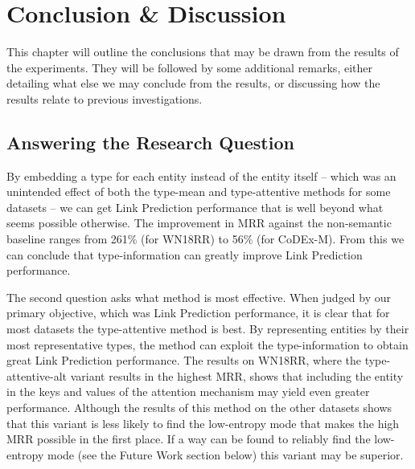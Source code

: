 \chapter{Conclusion \& Discussion}
\label{ch:conclusion}



This chapter will outline the conclusions that may be drawn from the results of the experiments. They will be followed by some additional remarks, either detailing what else we may conclude from the results, or discussing how the results relate to previous investigations. 


\section*{Answering the Research Question}

\begin{quote}
    
\end{quote}
%
By embedding a type for each entity instead of the entity itself 
-- which was an unintended effect of both the type-mean and type-attentive methods for some datasets -- we can get Link Prediction performance that is well beyond what seems possible otherwise. 
The improvement in MRR against the non-semantic baseline ranges from 261\% (for WN18RR) to 56\% (for CoDEx-M). 
From this we can conclude that type-information can greatly improve Link Prediction performance.

The second question asks what method is most effective.
When judged by our primary objective, which was Link Prediction performance, it is clear that for most datasets the type-attentive method is best. 
By representing entities by their most representative types, the method can exploit the type-information to obtain great Link Prediction performance.
The results on WN18RR, where the type-attentive-alt variant results in the highest MRR, shows that including the entity in the keys and values of the attention mechanism may yield even greater performance. Although the results of this method on the other datasets shows that this variant is less likely to find the low-entropy mode that makes the high MRR possible in the first place. If a way can be found to reliably find the low-entropy mode (see the Future Work section below) this variant may be superior.


